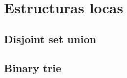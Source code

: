 \section{Estructuras locas}
    \subsection{Disjoint set union}
    

    \subsection{Binary trie}
    